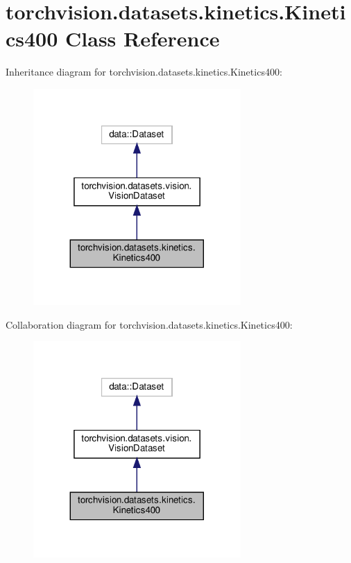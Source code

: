 \hypertarget{classtorchvision_1_1datasets_1_1kinetics_1_1Kinetics400}{}\section{torchvision.\+datasets.\+kinetics.\+Kinetics400 Class Reference}
\label{classtorchvision_1_1datasets_1_1kinetics_1_1Kinetics400}


Inheritance diagram for torchvision.\+datasets.\+kinetics.\+Kinetics400\+:
\nopagebreak
\begin{figure}[H]
\begin{center}
\leavevmode
\includegraphics[width=224pt]{classtorchvision_1_1datasets_1_1kinetics_1_1Kinetics400__inherit__graph}
\end{center}
\end{figure}


Collaboration diagram for torchvision.\+datasets.\+kinetics.\+Kinetics400\+:
\nopagebreak
\begin{figure}[H]
\begin{center}
\leavevmode
\includegraphics[width=224pt]{classtorchvision_1_1datasets_1_1kinetics_1_1Kinetics400__coll__graph}
\end{center}
\end{figure}
